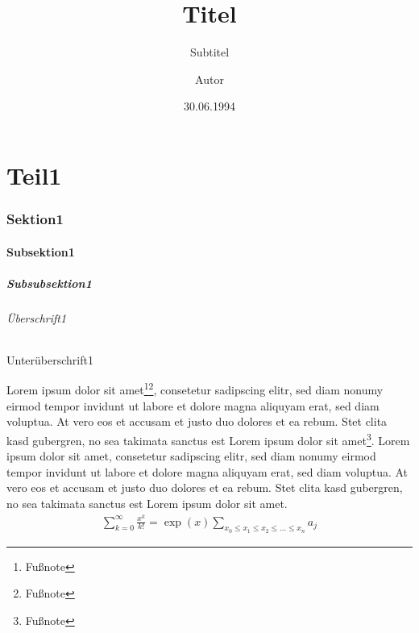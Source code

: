 \documentclass[pointlessnumbers]{scrartcl} %
\begin{document}
\titlehead{Titelkopf}
\title{Titel}
\subject{Oberthema}
\subtitle{Subtitel}
\author{Autor}
\date{30.06.1994}
\publishers{Herausgeber}
\dedication{Widmung}
\maketitle

\tableofcontents

\part{Teil1}
\section{Sektion1}
\subsection{Subsektion1}
\subsubsection{Subsubsektion1}
\paragraph{Überschrift1}
\subparagraph{Unterüberschrift1}
Lorem ipsum dolor sit amet\footnote{Fußnote}\footnote{Fußnote}, consetetur sadipscing elitr, sed diam nonumy eirmod tempor invidunt ut labore et dolore magna aliquyam erat, sed diam voluptua. At vero eos et accusam et justo duo dolores et ea rebum. Stet clita kasd gubergren, no sea takimata sanctus est Lorem ipsum dolor sit amet\footnote{Fußnote}. Lorem ipsum dolor sit amet, consetetur sadipscing elitr, sed diam nonumy eirmod tempor invidunt ut labore et dolore magna aliquyam erat, sed diam voluptua. At vero eos et accusam et justo duo dolores et ea rebum. Stet clita kasd gubergren, no sea takimata sanctus est Lorem ipsum dolor sit amet\cite{dummy}.
\begin{align*}
 \sum_{k = 0}^{ \infty} \frac{x^{k}}{k!} = \exp(x)
\sum_{x_0 \le x_1 \le x_2 \le ... \le x_n} a_j
\end{align*}

\listoffigures
\listoftables

\end{document}
